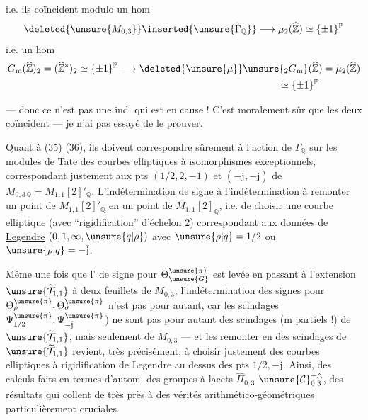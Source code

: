 i.e. ils coïncident modulo un hom
\[
\deleted{\unsure{M_{0,3}}}\inserted{\unsure{\widetilde\Gamma_{\mathbb Q}}}
\longrightarrow\mu_2(\widehat{\mathbb Z})\simeq\{\pm1\}^{\mathbb P}
\]
i.e. un hom
\[
\begin{aligned}
G_{\mathrm m}(\widehat{\mathbb Z})_2
&=(\widehat{\mathbb Z}^{*})_2\simeq\{\pm1\}^{\mathbb P}
\longrightarrow\deleted{\unsure{\mu}}\unsure{{}_2G_{\mathrm m}}(\widehat{\mathbb Z})
=\mu_2(\widehat{\mathbb Z})\\
&\hspace{24em}\simeq\{\pm1\}^{\mathbb P}
\end{aligned}
\]

--- donc ce n'est pas une  ind. qui est en cause !
C'est moralement sûr que les deux coïncident --- je n'ai pas essayé de le
prouver.

Quant à (35) (36), ils doivent correspondre sûrement à l'action de
$\Gamma_{\mathbb Q}$ sur les modules de Tate des courbes elliptiques à
isomorphismes exceptionnels, correspondant justement aux pts
$(1/2,2,-1)$ et $(-\overline{\mathrm j},-\mathrm j)$ de
$M_{0,3\,\mathbb Q}=M_{1,1}[2]'_{\mathbb Q}$.
L'indétermination de signe   à l'indétermination
à remonter un point de $M_{1,1}[2]'_{\mathbb Q}$ en un point de
$M_{1,1}[2]_{\mathbb Q}$, i.e. de choisir une courbe elliptique
(avec ``\uline{rigidification}'' d'échelon 2) correspondant aux données de
\uline{Legendre} $(0,1,\infty,\unsure{q|\rho})$ avec
$\unsure{\rho|q}=1/2$ ou $\unsure{\rho|q}=-\overline{\mathrm j}$.

Même une fois que l' de signe pour
$\Theta_{\unsure{G}}^{\unsure{\pi}}$ est levée en passant à l'extension
$\unsure{\widetilde{\mathcal T}_{1,1}}$ à deux feuillets de
$\widetilde M_{0,3}$, l'indétermination des signes pour
$\Theta_{\rho}^{\unsure{\pi}},\Theta_{\sigma}^{\unsure{\pi}}$
n'est pas  pour autant, car les scindages
\deleted{$\unsure{\Psi_{\rho}^{\pi},\Psi_{\sigma}^{\pi}}$}
$\Psi_{1/2}^{\unsure{\pi}},\Psi_{-\overline{\mathrm j}}^{\unsure{\pi}}$)
ne sont pas pour autant des scindages ($\overline{\mathrm m}$ partiels !)
de  
$\unsure{\widetilde{\mathcal T}_{1,1}}$, mais seulement de
$\widetilde M_{0,3}$ --- et les remonter en des scindages de
$\unsure{\widetilde{\mathcal T}_{1,1}}$
revient, très précisément, à choisir justement des courbes elliptiques à
rigidification de Legendre au dessus des pts $1/2,-\overline{\mathrm j}$.
Ainsi, des calculs faits en termes d'autom. des groupes à lacets
$\widehat\Pi_{0,3}$  
$\unsure{\mathcal{C}}_{0,3}^{+\wedge}$,
 
des résultats qui collent de très près à des vérités arithmético-géométriques
particulièrement cruciales.

